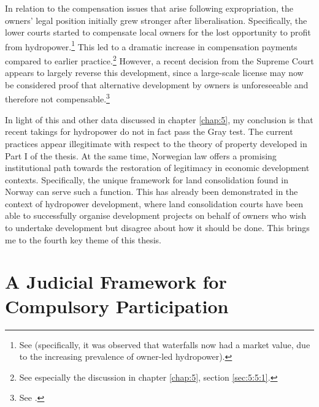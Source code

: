 In relation to the compensation issues that arise following expropriation, the owners' legal position initially grew stronger after liberalisation. Specifically, the lower courts started to compensate local owners for the lost opportunity to profit from hydropower.\footnote{See \cite{uleberg08} (specifically, it was observed that waterfalls now had a market value, due to the increasing prevalence of owner-led hydropower).} This led to a dramatic increase in compensation payments compared to earlier practice.\footnote{See especially the discussion in chapter \ref{chap:5}, section \ref{sec:5:5:1}.} However, a recent decision from the Supreme Court appears to largely reverse this development, since a large-scale license may now be considered proof that alternative development by owners is unforeseeable and therefore not compensable.\footnote{See \cite{otra13}.} 

In light of this and other data discussed in chapter \ref{chap:5}, my conclusion is that recent takings for hydropower do not in fact pass the Gray test. The current practices appear illegitimate with respect to the theory of property developed in Part I of the thesis. At the same time, Norwegian law offers a promising institutional path towards the restoration of legitimacy in economic development contexts. Specifically, the unique framework for land consolidation found in Norway can serve such a function. This has already been demonstrated in the context of hydropower development, where land consolidation courts have been able to successfully organise development projects on behalf of owners who wish to undertake development but disagree about how it should be done. This brings me to the fourth key theme of this thesis.

\section{A Judicial Framework for Compulsory Participation}\label{sec:4}

